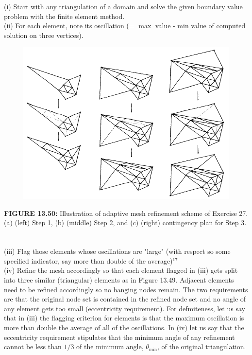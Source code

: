 \documentclass[../main.tex]{subfiles}
\begin{document}
\begin{enumerate}
(i) Start with any triangulation of a domain and solve the given boundary value problem with the finite element method.\\
(ii) For each element, note its oscillation (= $\max$ value - min value of computed solution on three vertices).
\begin{figure}[H]
\includegraphics[width=0.9\linewidth]{37}
	\centering
	\label{pfig:ch13_37}
\end{figure}
\textbf{FIGURE 13.50:} Illustration of adaptive mesh refinement scheme of Exercise 27. (a) (left) Step 1, (b) 
(middle) Step 2, and (c) (right) contingency plan for Step 3. 
\\
\\
\\
(iii) Flag those elements whose oscillations are "large" (with respect so some specified indicator, 
say more than double of the average)$^{17}$\\ 
(iv) Refine the mesh accordingly so that each element flagged in (iii) gets split into three similar 
(triangular) elements as in Figure 13.49. Adjacent elements need to be refined accordingly so 
no hanging nodes remain. The two requirements are that the original node set is contained in the 
refined node set and no angle of any element gets too small (eccentricity requirement). 
For defmiteness, let us say that in (iii) the flagging criterion for elements is that the maximum oscillation is more than double the average of all of the oscillations. In (iv) let us say that the eccentricity requirement stipulates that the minimum angle of any refinement cannot be less than $1 / 3$ of the minimum angle, $\theta_{\min }$, of the original triangulation.\\

\end{enumerate}
\end{document}
